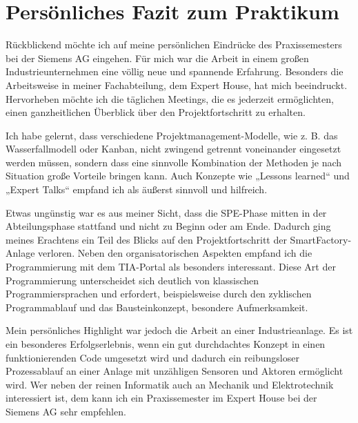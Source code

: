 \chapter{Persönliches Fazit zum Praktikum}

Rückblickend möchte ich auf meine persönlichen Eindrücke des Praxissemesters bei der Siemens AG eingehen. Für mich war die Arbeit in einem großen 
Industrieunternehmen eine völlig neue und spannende Erfahrung. Besonders die Arbeitsweise in meiner Fachabteilung, dem Expert House, hat mich beeindruckt. 
Hervorheben möchte ich die täglichen Meetings, die es jederzeit ermöglichten, einen ganzheitlichen Überblick über den Projektfortschritt zu erhalten.

Ich habe gelernt, dass verschiedene Projektmanagement-Modelle, wie z. B. das Wasserfallmodell oder Kanban, nicht zwingend getrennt voneinander eingesetzt werden 
müssen, sondern dass eine sinnvolle Kombination der Methoden je nach Situation große Vorteile bringen kann. Auch Konzepte wie „Lessons learned“ und „Expert Talks“
empfand ich als äußerst sinnvoll und hilfreich.

Etwas ungünstig war es aus meiner Sicht, dass die SPE-Phase mitten in der Abteilungsphase stattfand und nicht zu Beginn oder am Ende. Dadurch ging meines 
Erachtens ein Teil des Blicks auf den Projektfortschritt der SmartFactory-Anlage verloren. Neben den organisatorischen Aspekten empfand ich die Programmierung mit
dem TIA-Portal als besonders interessant. Diese Art der Programmierung unterscheidet sich deutlich von klassischen Programmiersprachen und erfordert, 
beispielsweise durch den zyklischen Programmablauf und das Bausteinkonzept, besondere Aufmerksamkeit.

Mein persönliches Highlight war jedoch die Arbeit an einer Industrieanlage. Es ist ein besonderes Erfolgserlebnis, wenn ein gut durchdachtes Konzept in einen 
funktionierenden Code umgesetzt wird und dadurch ein reibungsloser Prozessablauf an einer Anlage mit unzähligen Sensoren und Aktoren ermöglicht wird. Wer neben
der reinen Informatik auch an Mechanik und Elektrotechnik interessiert ist, dem kann ich ein Praxissemester im Expert House bei der Siemens AG sehr empfehlen.
